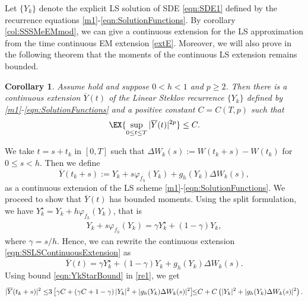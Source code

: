 \documentclass[sort&compress, preprint]{elsarticle}
\theoremstyle{definition}
\theoremstyle{plain}%
\newtheorem{corollary}{Corollary}[section]
\theoremstyle{remark}
\newcommand{\SM}{LS\xspace}
\begin{document}
	
Let $\{Y_k\}$ denote the explicit \SM solution of SDE \eqref{eqn:SDE1} defined by 
the recurrence equations \eqref{m1}-\eqref{eqn:SolutionFunctions}.
By corollary \ref{col:SSSMeEMmod}, we can give a continuous extension for the \SM approximation 
from the time continuous EM extension  \eqref{extE}. 
Moreover, we will also prove in the following theorem that the  moments 
of the continuous LS extension remains bounded.
\begin{corollary}\label{col:ContinuousExtBoundedMoments}
	Assume  hold and suppose  $0<h<1$ and $p\geq 
	2$. Then there is a continuous extension $\overline{Y}(t)$ of the 
	Linear Steklov recurrence $\{Y_k\}$ defined by  
	\eqref{m1}-\eqref{eqn:SolutionFunctions}  and a positive constant $C=C(T,p)$ such 
	that
	\begin{equation*}
		\EX{\sup_{0\leq t \leq T} |\overline{Y}(t)|^{2p} }
		\leq C.
	\end{equation*}
\end{corollary}
	\begin{pf}
		We take $t=s+t_k$ in $ [0,T]$ such that $\Delta W_k(s):= W(t_k+s)- W(t_k)$ for $0\leq s <h$.
		Then we define 
		\begin{equation}\label{eqn:SSLSContinuousExtension}
			\overline{Y}(t_k+s):= Y_k + s \varphi_{f_h}(Y_k) + g_h(Y_k)\Delta W_k(s),
		\end{equation}
		as a continuous extension of the \SM scheme \eqref{m1}-\eqref{eqn:SolutionFunctions}. 
		We proceed to show that $\overline{Y}(t)$ has bounded moments.
		Using the split formulation, we have $Y_k^{\star}= Y_k + h \varphi_{f_h}(Y_k)$,
		that is
		\begin{align*}
			Y_k + s \varphi_{f_h}(Y_k)=\gamma Y_k^{\star} + (1-\gamma)Y_k,
		\end{align*}
		where $\gamma = s/h$. Hence, we can rewrite the continuous extension \eqref{eqn:SSLSContinuousExtension} as
		\begin{equation}\label{re1}
			\overline{Y}(t) =
			\gamma Y^{\star}_k + (1-\gamma) Y_k +g_h(Y_k) \Delta W_k(s). %
		\end{equation}
		Using bound \eqref{eqn:YkStarBound} in \eqref{re1}, we get
		\begin{align}
			|\overline{Y}(t_k+s) |^2 
			\leq \hspace{-0.1cm}
				3\left[
					\gamma C
					+
					\left(
						\gamma C +1 - \gamma
					\right)
					|Y_k|^2
					+
					|g_h(Y_k)\Delta W_k(s)|^2
			\right] \hspace{-0.15cm}\leq\hspace{-0.1cm}
			C
			+
			C
			\left(
				|Y_k|^2 + |g_h(Y_k)\Delta W_k(s)|^2
			\right).
		\notag
		\end{align}
	\end{pf}
\end{document}
